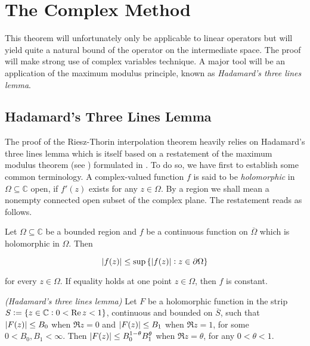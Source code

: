\section{The Complex Method}
This theorem will unfortunately only be applicable to linear operators but will yield quite a natural bound of the operator on the intermediate space. The proof will make strong use of complex variables technique. A major tool will be an application of the maximum modulus principle, known as \emph{Hadamard's three lines lemma}.

\subsection{Hadamard's Three Lines Lemma}
The proof of the Riesz-Thorin interpolation theorem heavily relies on Hadamard's three lines lemma which is itself based on a restatement of the maximum modulus theorem (see \cite[212]{rudin:rc_analysis:1987}) formulated in \cite[253]{rudin:rc_analysis:1987}. To do so, we have first to establish some common terminology. A complex-valued function $f$ is said to be \emph{holomorphic} in $\Omega \subseteq \mathbb{C}$ open, if $f'(z)$ exists for any $z \in \Omega$. By a region we shall mean a nonempty connected open subset of the complex plane. The restatement reads as follows.

\begin{theorem*}
	Let $\Omega \subseteq \mathbb{C}$ be a bounded region and $f$ be a continuous function on $\overline{\Omega}$ which is holomorphic in $\Omega$. Then 

	\begin{equation*}
		\abs[0]{f(z)} \leq \sup\cbr[0]{ \abs[0]{f(z)} : z \in \partial\Omega}
	\end{equation*}

	\noindent for every $z \in \Omega$. If equality holds at one point $z \in \Omega$, then $f$ is constant.
\end{theorem*}

\begin{mdframed}
	\begin{lemma}\emph{(Hadamard's three lines lemma)}
		Let $F$ be a holomorphic function in the strip $S := \cbr[0]{ z \in \mathbb{C}: 0 < \Re z < 1}$, continuous and bounded on $\overline{S}$, such that $\abs[0]{F(z)} \leq B_0$ when $\Re z = 0$ and $\abs[0]{F(z)} \leq B_1$ when $\Re z = 1$, for some $0 < B_0,B_1 < \infty$. Then $\abs[0]{F(z)}\leq B_0^{1 - \theta}B_1^\theta$ when $\Re z = \theta$, for any $0 < \theta < 1$.
		\label{lem:HTL}
	\end{lemma}
\end{mdframed}

